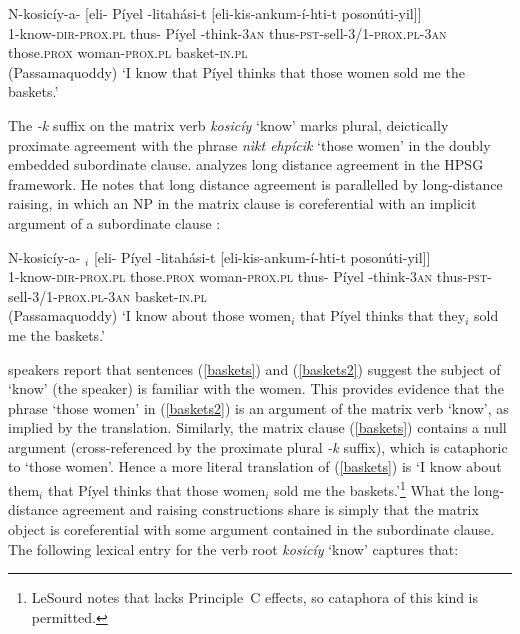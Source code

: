 \documentclass[output=paper
 	        ,biblatex
                ,babelshorthands
                ,newtxmath
                ,draftmode
                ,colorlinks, citecolor=brown
]{langscibook}
\begin{document}
\begin{exe}
\ex\label{baskets}
\gll N-kosicíy-a-  [eli- Píyel -litah\'{a}si-t           {[eli-kis-ankum-í-hti-t}     	{poson\'{u}ti-yil]]} \\
     1-know-\textsc{dir-prox.pl} \spacebr{}thus- Píyel -think-\textsc{3an} { \spacebr{}thus-\textsc{pst}-sell-\textsc{3/1-prox.pl-3an}}         those.\textsc{prox}  woman-\textsc{prox.pl}     basket-\textsc{in.pl}\\\hfill(Passamaquoddy)
\glt `I know that Píyel thinks that those women sold me the baskets.’
\end{exe}

\noindent
The \textit{-k} suffix on the matrix verb \textit{kosicíy} `know' marks plural, deictically proximate agreement with the phrase \textit{n\`{i}kt ehpícik} `those women'  in the doubly embedded subordinate clause.  \citet{LeSourd:2018} analyzes  long distance agreement in the HPSG framework.   He notes that   long distance agreement is parallelled by long-distance raising, in which an NP in the matrix clause is coreferential with an implicit argument of a subordinate clause \citep[example\,(4)]{LeSourd:2018}:  

\begin{exe}
\ex\label{baskets2}
\gll N-kosicíy-a-   $_i$ [eli- Píyel -litah\'{a}si-t  [eli-kis-ankum-í-hti-t   	{poson\'{u}ti-yil]]} \\
     1-know-\textsc{dir-prox.pl} those.\textsc{prox}  woman-\textsc{prox.pl} \spacebr{}thus- Píyel -think-\textsc{3an} \spacebr{}thus-\textsc{pst}-sell-\textsc{3/1-prox.pl-3an}         {}    basket-\textsc{in.pl}\\\hfill(Passamaquoddy)
\glt `I know about those women$_i$ that Píyel thinks that they$_i$ sold me the baskets.’
\end{exe}

\noindent
{} speakers report that sentences (\ref{baskets}) and (\ref{baskets2}) suggest the subject of `know' (the speaker) is familiar with the women.  This provides evidence that the phrase `those women' in (\ref{baskets2}) is an argument of the matrix verb `know', as implied by the translation.  
Similarly, the matrix clause (\ref{baskets}) contains a null argument (cross-referenced by the
proximate plural \textit{-k}  suffix), which is  cataphoric to `those women'.  Hence a more literal
translation of (\ref{baskets}) is `I know about them$_i$ that Píyel thinks that those women$_i$ sold
me the baskets.'\footnote{LeSourd notes that  lacks
  Principle~C effects, so cataphora of this kind is permitted.}  What the long-distance agreement and raising constructions share is simply that the matrix object is coreferential with some argument contained in the subordinate clause.  The following lexical entry for the verb root \textit{kosicíy} `know' captures that:
\end{document}
